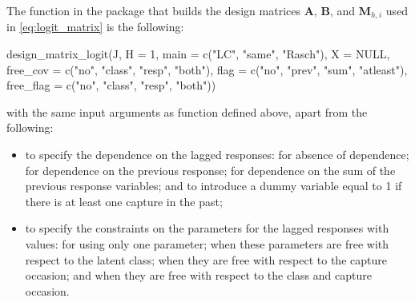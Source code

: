 The function in the package that builds the design matrices $\bm{A}$, $\bm{B}$, and $\bm{M}_{h,i}$ used in \eqref{eq:logit_matrix} is the following:
%
\begin{example*}
design_matrix_logit(J, H = 1, main = c("LC", "same", "Rasch"), X = NULL,
                    free_cov = c("no", "class", "resp", "both"),
                    flag = c("no", "prev", "sum", "atleast"),
                    free_flag = c("no", "class", "resp", "both"))
\end{example*}
%
with the same input arguments as function  defined above, apart from the following:
%
\begin{itemize}
%
\item {} to specify the dependence on the lagged responses:  for absence of dependence;  for dependence on the previous response;  for dependence on the sum of the previous response variables; and  to introduce a dummy variable equal to 1 if there is at least one capture in the past;
%
\item {} to specify the constraints on the parameters for the lagged responses with values:  for using only one parameter;  when these parameters are free with respect to the latent class;  when they are free with respect to the capture occasion; and  when they are free with respect to the class and capture occasion.
%
\end{itemize}
%
